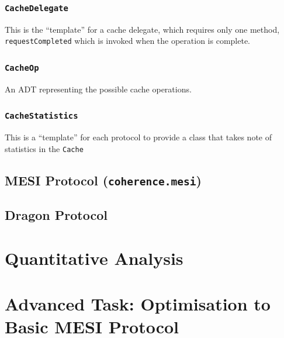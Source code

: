 \documentclass[nonacm,acmsmall,screen,11pt]{acmart}
\begin{document}
\subsubsection{\texttt{CacheDelegate}}
This is the ``template'' for a cache delegate, which requires only one method, \texttt{requestCompleted} which is invoked when the operation is complete.

\subsubsection{\texttt{CacheOp}}
An ADT representing the possible cache operations.

\subsubsection{\texttt{CacheStatistics}}
This is a ``template'' for each protocol to provide a class that takes note of statistics in the \texttt{Cache}

\subsection{MESI Protocol (\texttt{coherence.mesi})}

\subsection{Dragon Protocol}

\section{Quantitative Analysis}

\section{Advanced Task: Optimisation to Basic MESI Protocol}
\cite{microelectronics1997ultrasparc}



\end{document}
